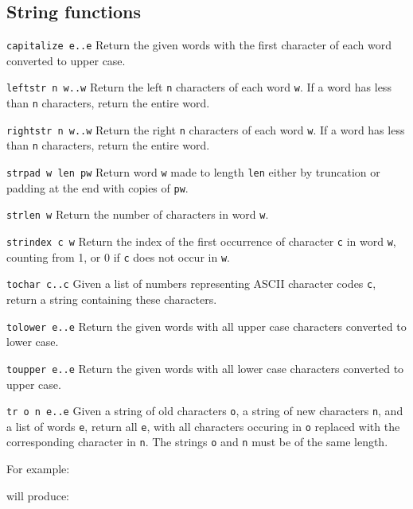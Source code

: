 \subsection{String functions}
\begin{desctab}
\item[\texttt{capitalize e..e}\index{capitalize@\texttt{capitalize}}]
Return the given words with the first character of each word converted
to upper case.

\item[\texttt{leftstr n w..w}\index{leftstr@\texttt{leftstr}}]
Return the left \texttt{n} characters of each word \texttt{w}.  If
a word has less than \texttt{n} characters, return the entire word.

\item[\texttt{rightstr n w..w}\index{rightstr@\texttt{rightstr}}]
Return the right \texttt{n} characters of each word \texttt{w}.  If
a word has less than \texttt{n} characters, return the entire word.

\item[\texttt{strpad w len pw}\index{strpad@\texttt{strpad}}]
Return word \texttt{w} made to length \texttt{len} either by
truncation or padding at the end with copies of \texttt{pw}.

\item[\texttt{strlen w}\index{strlen@\texttt{strlen}}]
Return the number of characters in word \texttt{w}.

\item[\texttt{strindex c w}\index{strindex@\texttt{strindex}}]
Return the index of the first occurrence of character \texttt{c}
in word \texttt{w}, counting from 1, or 0 if \texttt{c} does not
occur in \texttt{w}.

\item[\texttt{tochar c..c}\index{tochar@\texttt{tochar}}]
Given a list of numbers representing ASCII character codes \verb'c',
return a string containing these characters.

\item[\texttt{tolower e..e}\index{tolower@\texttt{tolower}}]
Return the given words with all upper case characters converted to lower case.

\item[\texttt{toupper e..e}\index{toupper@\texttt{toupper}}]
Return the given words with all lower case characters
converted to upper case.

\item[\texttt{tr o n e..e}\index{tr@\texttt{tr}}]
Given a string of old characters \texttt{o}, a string of new characters
\texttt{n}, and a list of words \texttt{e}, return all \texttt{e},
with all characters occuring in \texttt{o} replaced with the
corresponding character in \texttt{n}.  The strings \texttt{o} and
\texttt{n} must be of the same length.
\end{desctab}
For example:
\begin{showfile}

\end{showfile}
will produce:
\begin{showfile}

\end{showfile}

